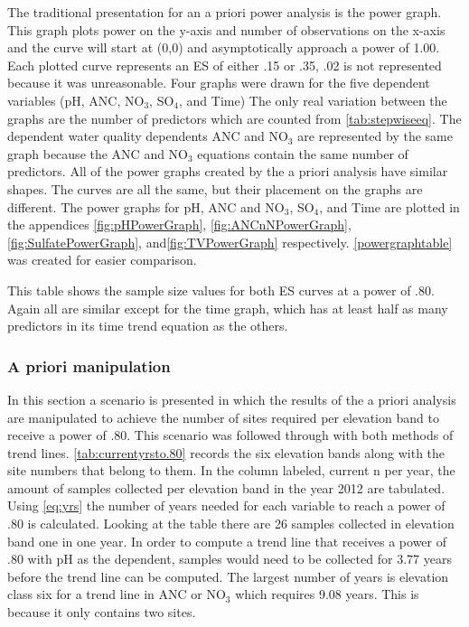 The traditional presentation for an a priori power analysis is the power graph.
This graph plots power on the y-axis and number of observations on the x-axis and the curve will start at (0,0) and asymptotically approach a power of 1.00.
Each plotted curve represents an ES of either .15 or .35, .02 is not represented because it was unreasonable.
Four graphs were drawn for the five dependent variables (pH, ANC, NO$_3$, SO$_4$, and Time)
The only real variation between the graphs are the number of predictors which are counted from \autoref{tab:stepwiseeq}.
The dependent water quality dependents ANC and NO$_3$ are represented by the same graph because the ANC and NO$_3$ equations contain the same number of predictors.
All of the power graphs created by the a priori analysis have similar shapes.
The curves are all the same, but their placement on the graphs are different.
The power graphs for pH, ANC and NO$_3$, SO$_4$, and Time are plotted in the appendices \autoref{fig:pHPowerGraph}, \autoref{fig:ANCnNPowerGraph}, \autoref{fig:SulfatePowerGraph}, and\autoref{fig:TVPowerGraph} respectively.
\autoref{powergraphtable} was created for easier comparison.

This table shows the sample size values for both ES curves at a power of .80.
Again all are similar except for the time graph, which has at least half as many predictors in its time trend equation as the others.

\subsubsection{A priori manipulation}

In this section a scenario is presented in which the results of the a priori analysis are manipulated to achieve the number of sites required per elevation band to receive a power of .80.
This scenario was followed through with both methods of trend lines.
\autoref{tab:currentyrsto.80} records the six elevation bands along with the site numbers that belong to them. 
 In the column labeled, current n per year, the amount of samples collected per elevation band in the year 2012 are tabulated.  
 Using \autoref{eq:yrs} the number of years needed for each variable to reach a power of .80 is calculated.
Looking at the table there are 26  samples collected in elevation band one in one year.  
In order to compute a trend line that receives a power of .80 with pH as the dependent,  samples would need to be collected for 3.77 years before the trend line can be computed.   
The largest number of years is elevation class six for a trend line in ANC or NO$_3$ which requires 9.08 years. 
This is because it only contains two sites.

